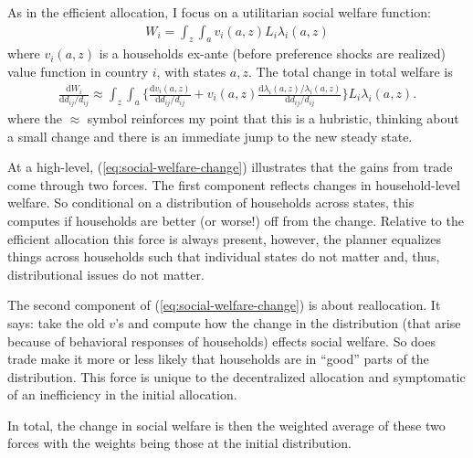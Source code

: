 \documentclass[12pt,pdftex]{article}
\begin{document}
\begin{onehalfspacing}
As in the efficient allocation, I focus on a utilitarian social welfare function:
\begin{align}
W_{i} = \int_{z} \int_{a}  v_{i}(a,z) L_i \lambda_{i}(a,z)
\label{eq:apx-social-welfare}
\end{align}
where $v_{i}(a,z)$ is a households ex-ante (before preference shocks are realized) value function in country $i$, with states $a,z$. The total change in total welfare is
\begin{align}
\frac{\mathrm{d} W_{i}}{\mathrm{d} d_{ij} / d_{ij}} \approx \int_{z} \int_{a} \bigg \{ \frac{\mathrm{d} v_i(a, z)}{\mathrm{d} d_{ij} / d_{ij}}  + v_{i}(a,z) \frac{\mathrm{d} \lambda_{i}(a,z)/ \lambda_{i}(a,z)}{\mathrm{d} d_{ij} / d_{ij}}  \bigg \} L_i \lambda_{i}(a,z).
\label{eq:social-welfare-change}
\end{align}
where the $\approx$ symbol reinforces my point that this is a hubristic, thinking about a small change and there is an immediate jump to the new steady state.

At a high-level, (\ref{eq:social-welfare-change}) illustrates that the gains from trade come through two forces. The first component reflects changes in household-level welfare. So conditional on a distribution of households across states, this computes if households are better (or worse!) off from the change. Relative to the efficient allocation this force is always present, however, the planner equalizes things across households such that individual states do not matter and, thus, distributional issues do not matter.

The second component of (\ref{eq:social-welfare-change}) is about reallocation. It says: take the old $v$'s and compute how the change in the distribution (that arise because of behavioral responses of households) effects social welfare. So does trade make it more or less likely that households are in ``good'' parts of the distribution. This force is unique to the decentralized allocation and symptomatic of an inefficiency in the initial allocation.

In total, the change in social welfare is then the weighted average of these two forces with the weights being those at the initial distribution.


\end{onehalfspacing}
\end{document}
